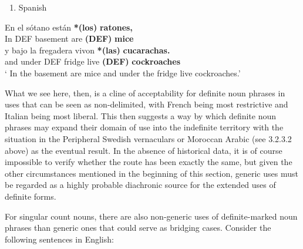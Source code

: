 \begin{enumerate} %
\item 
\label{bkm:Ref172696740}Spanish

\end{enumerate} %
\ea\label{}
\gll En  el  sótano  están  \textbf{*(los)}\textbf{  ratones,}\\


In  DEF  basement  are  \textbf{(DEF)} \textbf{mice}\\ %


\ea\label{}
\gll y  bajo  la  fregadera  vivon  \textbf{*(las)} \textbf{cucarachas.}\\


and  under  DEF  fridge  live  \textbf{(DEF)} \textbf{cockroaches}\\ %


‘ In the basement are mice and under the fridge live cockroaches.’  
\z


What we see here, then, is a cline of acceptability for definite noun phrases in uses that can be seen as non-delimited, with French being most restrictive and Italian being most liberal. This then suggests a way by which definite noun phrases may expand their domain of use into the indefinite territory with the situation in the Peripheral Swedish vernaculars or Moroccan Arabic (see 3.2.3.2 above) as the eventual result. In the absence of historical data, it is of course impossible to verify whether the route has been exactly the same, but given the other circumstances mentioned in the beginning of this section, generic uses must be regarded as a highly probable diachronic source for the extended uses of definite forms. 

For singular count nouns, there are also non-generic uses of definite-marked noun phrases than generic ones that could serve as bridging cases. Consider the following sentences in English:

